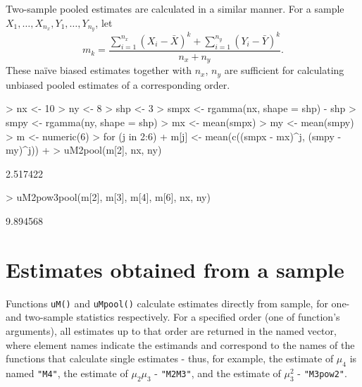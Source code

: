 \documentclass[12pt]{article}
\begin{document}
\begin{sloppypar}
Two-sample pooled estimates are calculated in a similar manner. For a sample $X_1, \dotsc, X_{n_x}, Y_1, \dotsc, Y_{n_y}$, let
\begin{equation}
m_k = \frac{\sum_{i = 1}^{n_x} (X_i - \bar{X})^k + \sum_{i = 1}^{n_y} (Y_i - \bar{Y})^k}{n_x + n_y}.
\end{equation}
These na\"ive biased estimates together with $n_x$, $n_y$ are sufficient for calculating unbiased pooled estimates of a corresponding order.
\end{sloppypar}
\begin{Schunk}
\begin{Sinput}
> nx <- 10
> ny <- 8
> shp <- 3
> smpx <- rgamma(nx, shape = shp) - shp
> smpy <- rgamma(ny, shape = shp)
> mx <- mean(smpx)
> my <- mean(smpy)
> m  <- numeric(6)
> for (j in 2:6) {
+   m[j] <- mean(c((smpx - mx)^j, (smpy - my)^j))
+ }
> uM2pool(m[2], nx, ny)
\end{Sinput}
\begin{Soutput}
[1] 2.517422
\end{Soutput}
\begin{Sinput}
> uM2pow3pool(m[2], m[3], m[4], m[6], nx, ny)
\end{Sinput}
\begin{Soutput}
[1] 9.894568
\end{Soutput}
\end{Schunk}

\section{Estimates obtained from a sample}

Functions \texttt{uM()} and \texttt{uMpool()} calculate estimates directly from sample, for one- and two-sample statistics respectively. For a specified order (one of function's  arguments), all estimates up to that order are returned in the named vector, where element names indicate the estimands and correspond to the names of the functions that calculate single estimates - thus, for example, the estimate of $\mu_4$ is named \texttt{"M4"}, the estimate of $\mu_2 \mu_3$ - \texttt{"M2M3"}, and the estimate of $\mu_3^2$ - \texttt{"M3pow2"}.
\end{document}
